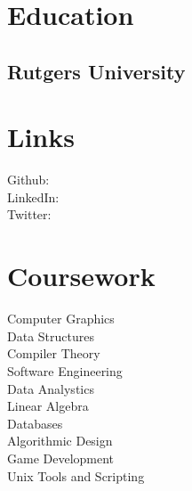 \documentclass[]{deedy-resume-openfont}
\begin{document}
%
%


%
%

\begin{minipage}[t]{0.33\textwidth} 


\section{Education} 

\subsection{Rutgers University}
\sectionsep
{}
\sectionsep


\section{Links} 
Github: \href{https://github.com/11}
{} \\
LinkedIn:  \href{https://www.linkedin.com/in/dougjrudolph}{} \\
Twitter: \href{https://twitter.com/doug\_rudolph}
{} \\
\sectionsep



\section{Coursework}
Computer Graphics \\
Data Structures \\
Compiler Theory\\
Software Engineering\\
Data Analystics\\
Linear Algebra\\
Databases \\
Algorithmic Design \\ 
Game Development \\
Unix Tools and Scripting \\
\sectionsep


\end{minipage}
\end{document}
